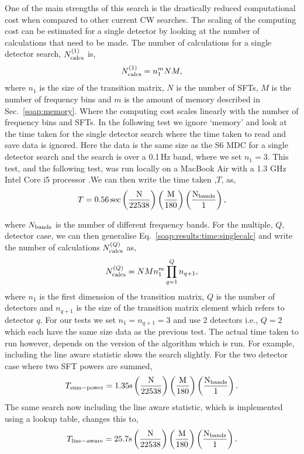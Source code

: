 One of the main strengths of this search is the drastically reduced computational cost when compared to other current \gls{CW} searches.
The scaling of the computing cost can be estimated for a single detector by looking at the number of calculations that need to be made. 
The number of calculations for a single detector search, $N^{(1)}_{\rm{calcs}}$ is,
\begin{equation}
\label{soap:results:time:singlecalc}
N^{(1)}_{\rm{calcs}} = n_{1}^{m}NM,
\end{equation}
where $n_1$ is the size of the transition matrix, $N$ is the number of \glspl{SFT}, $M$ is the number of frequency bins and $m$ is the amount of memory described in Sec.~\ref{soap:memory}. Where the computing cost scales linearly with the number of frequency bins and \glspl{SFT}.
In the following test we ignore `memory' and look at the time taken for the single detector search where the time taken to read and save data is ignored. Here the data is the same size as the S6 \gls{MDC} for a single detector search and the search is over a 0.1\,Hz band, where we set $n_1=3$. This test, and the following test, was run locally on a MacBook Air with a 1.3 GHz Intel Core i5 processor .We can then write the time taken ,$T$, as,
%
\begin{equation}
T = 0.56\,\rm{sec}\left( \frac{N}{22538}\right) \left( \frac{M}{180}\right) \left( \frac{N_{\rm{bands}}}{1}\right),
\end{equation}

where  $N_{\rm{bands}}$ is the number of different frequency
bands.
For the multiple, $Q$, detector case, we can then generalise Eq.~\ref{soap:results:time:singlecalc} and write the number of calculations $N^{(Q)}_{\rm{calcs}}$ as,
\begin{equation}
\label{soap:results:time:numbercalcs}
N^{(Q)}_{\rm{calcs}} = NMn_{1}^{m} \prod_{q=1}^{Q}n_{q+1},
\end{equation}
where $n_1$ is the first dimension of the transition matrix, $Q$ is the number of detectors and $n_{q+1}$ is the size of the transition matrix element which refers to detector $q$.
For our tests we set $n_1=n_{q+1}=3$ and use 2 detectors i.e., $Q=2$ which each have the same size data as the previous test. The actual time taken to run however, depends on the version of the algorithm which is run. For example, including the line aware statistic slows the search slightly.
For the two detector case where two \gls{SFT} powers are summed,
\begin{equation}
T_{\rm{sum-power}} = 1.35 \rm{s}\left( \frac{N}{22538}\right) \left( \frac{M}{180}\right) \left( \frac{N_{\rm{bands}}}{1}\right).
\end{equation}
The same search now including the line aware statistic, which is implemented using a lookup table, changes this to,
\begin{equation}
T_{\rm{line-aware}} = 25.7 \rm{s}\left( \frac{N}{22538}\right) \left( \frac{M}{180}\right) \left( \frac{N_{\rm{bands}}}{1}\right).
\end{equation}

